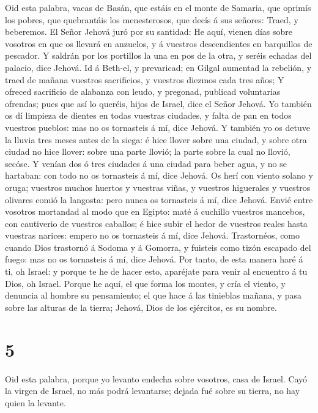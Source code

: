  Oid esta palabra, vacas de Basán, que estáis en el monte de
Samaria, que oprimís los pobres, que quebrantáis los menesterosos, que
decís á sus señores: Traed, y beberemos.  El Señor Jehová
juró por su santidad: He aquí, vienen días sobre vosotros en que os
llevará en anzuelos, y á vuestros descendientes en barquillos de
pescador.  Y saldrán por los portillos la una en pos de la
otra, y seréis echadas del palacio, dice Jehová.  Id á
Beth-el, y prevaricad; en Gilgal aumentad la rebelión, y traed de mañana
vuestros sacrificios, y vuestros diezmos cada tres años;  Y
ofreced sacrificio de alabanza con leudo, y pregonad, publicad
voluntarias ofrendas; pues que así lo queréis, hijos de Israel, dice el
Señor Jehová.  Yo también os dí limpieza de dientes en todas
vuestras ciudades, y falta de pan en todos vuestros pueblos: mas no os
tornasteis á mí, dice Jehová.  Y también yo os detuve la
lluvia tres meses antes de la siega: é hice llover sobre una ciudad, y
sobre otra ciudad no hice llover: sobre una parte llovió; la parte sobre
la cual no llovió, secóse.  Y venían dos ó tres ciudades á
una ciudad para beber agua, y no se hartaban: con todo no os tornasteis
á mí, dice Jehová.  Os herí con viento solano y oruga;
vuestros muchos huertos y vuestras viñas, y vuestros higuerales y
vuestros olivares comió la langosta: pero nunca os tornasteis á mí, dice
Jehová.  Envié entre vosotros mortandad al modo que en
Egipto: maté á cuchillo vuestros mancebos, con cautiverio de vuestros
caballos; é hice subir el hedor de vuestros reales hasta vuestras
narices: empero no os tornasteis á mí, dice Jehová. 
Trastornéos, como cuando Dios trastornó á Sodoma y á Gomorra, y fuisteis
como tizón escapado del fuego: mas no os tornasteis á mí, dice Jehová.
 Por tanto, de esta manera haré á ti, oh Israel: y porque
te he de hacer esto, aparéjate para venir al encuentro á tu Dios, oh
Israel.  Porque he aquí, el que forma los montes, y cría el
viento, y denuncia al hombre su pensamiento; el que hace á las tinieblas
mañana, y pasa sobre las alturas de la tierra; Jehová, Dios de los
ejércitos, es su nombre.

\hypertarget{section-4}{%
\section{5}\label{section-4}}

 Oid esta palabra, porque yo levanto endecha sobre vosotros,
casa de Israel.  Cayó la virgen de Israel, no más podrá
levantarse; dejada fué sobre su tierra, no hay quien la levante.

